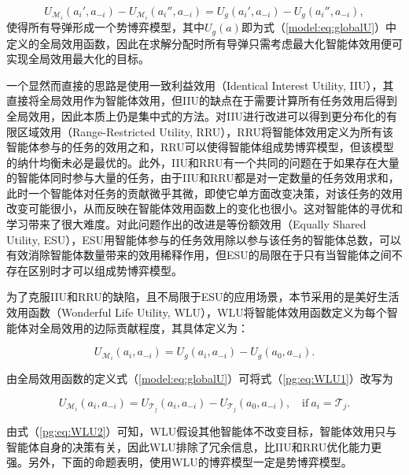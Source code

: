 \begin{equation}
\label{pg:eq:pgU}
	U_{\mathcal{M}_i}(a_i',a_{-i})-U_{\mathcal{M}_i}(a_i'',a_{-i})=U_g(a_i',a_{-i})-U_g(a_i'',a_{-i}),
\end{equation}
使得所有导弹形成一个势博弈模型，其中$U_g(a)$即为式（\ref{model:eq:globalU}）中定义的全局效用函数，因此在求解分配时所有导弹只需考虑最大化智能体效用便可实现全局效用最大化的目标。

一个显然而直接的思路是使用一致利益效用（Identical Interest Utility, IIU），其直接将全局效用作为智能体效用，但IIU的缺点在于需要计算所有任务效用后得到全局效用，因此本质上仍是集中式的方法。对IIU进行改进可以得到更分布化的有限区域效用（Range-Restricted Utility, RRU），RRU将智能体效用定义为所有该智能体参与的任务的效用之和，RRU可以使得智能体组成势博弈模型，但该模型的纳什均衡未必是最优的。此外，IIU和RRU有一个共同的问题在于如果存在大量的智能体同时参与大量的任务，由于IIU和RRU都是对一定数量的任务效用求和，此时一个智能体对任务的贡献微乎其微，即使它单方面改变决策，对该任务的效用改变可能很小，从而反映在智能体效用函数上的变化也很小。这对智能体的寻优和学习带来了很大难度。对此问题作出的改进是等份额效用（Equally Shared Utility, ESU），ESU用智能体参与的任务效用除以参与该任务的智能体总数，可以有效消除智能体数量带来的效用稀释作用，但ESU的局限在于只有当智能体之间不存在区别时才可以组成势博弈模型。

为了克服IIU和RRU的缺陷，且不局限于ESU的应用场景，本节采用的是美好生活效用函数（Wonderful Life Utility, WLU），WLU将智能体效用函数定义为每个智能体对全局效用的边际贡献程度，其具体定义为：

\begin{equation}
\label{pg:eq:WLU1}
	U_{\mathcal{M}_i}(a_i,a_{-i}) = U_g(a_i,a_{-i}) - U_g(a_0,a_{-i}).
\end{equation}

由全局效用函数的定义式（\ref{model:eq:globalU}）可将式（\ref{pg:eq:WLU1}）改写为

\begin{equation}
\label{pg:eq:WLU2}
	U_{\mathcal{M}_i}(a_i,a_{-i}) = U_{\mathcal{T}_j}(a_i,a_{-i}) - U_{\mathcal{T}_j}(a_0,a_{-i}),\quad \text{if}\ a_i=\mathcal{T}_j.
\end{equation}

由式（\ref{pg:eq:WLU2}）可知，WLU假设其他智能体不改变目标，智能体效用只与智能体自身的决策有关，因此WLU排除了冗余信息，比IIU和RRU优化能力更强。另外，下面的命题表明，使用WLU的博弈模型一定是势博弈模型。

